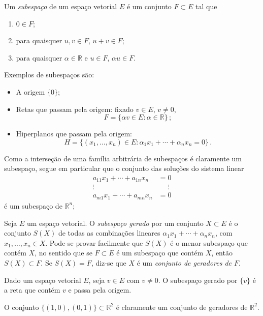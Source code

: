\documentclass[12pt,a4paper]{article}
\newcommand{\R}{\mathbb{R}}
\newtheorem{thm}{Teorema}[section]
\theoremstyle{definition}
\begin{document}
Um \textit{subespaço} de um espaço vetorial $E$ é um conjunto
$F\subset E$ tal que
\begin{enumerate}
\item $0\in F$;
\item para quaisquer $u,v\in F$, $u+v\in F$;
\item para quaisquer $\alpha\in\R$ e $u\in F$, $\alpha u\in F$.
\end{enumerate}

Exemplos de subespaços são:
\begin{itemize}
\item A origem $\{0\}$;
\item Retas que passam pela origem: fixado $v\in E$, $v\ne 0$,
  $$F=\{\alpha v\in E:\alpha\in\R\}\,;$$
\item Hiperplanos que passam pela origem:
  $$H=\{(x_1,\ldots,x_n)\in E:\alpha_1x_1+\cdots+\alpha_nx_n=0\}\,.$$
\end{itemize}

Como a interseção de uma família arbitrária de subespaços é claramente
um subespaço, segue em particular que o conjunto das soluções do
sistema linear
\begin{equation*}
  \begin{split}
    a_{11}x_1+\cdots+a_{1n}x_n&=0\\
    \vdots\qquad\qquad&\quad\,\,\vdots\\
    a_{m1}x_1+\cdots+a_{mn}x_n&=0
  \end{split}
\end{equation*}
é um subespaço de $\R^n$;

Seja $E$ um espaço vetorial. O \textit{subespaço gerado} por um
conjunto $X\subset E$ é o conjunto $S(X)$ de todas as combinações
lineares $\alpha_1x_1+\cdots+\alpha_nx_n$, com $x_1,\ldots,x_n\in
X$. Pode-se provar facilmente que $S(X)$ é o menor subespaço que
contém $X$, no sentido que se $F\subset E$ é um subespaço que contém
$X$, então $S(X)\subset F$. Se $S(X)=F$, diz-se que $X$ é um
\textit{conjunto de geradores de $F$}.

Dado um espaço vetorial $E$, seja $v\in E$ com $v\ne 0$. O subespaço
gerado por $\{v\}$ é a reta que contém $v$ e passa pela origem.

O conjunto $\{(1,0), (0,1)\}\subset \R^2$ é claramente um conjunto de
geradores de $\R^2$.

\end{document}

